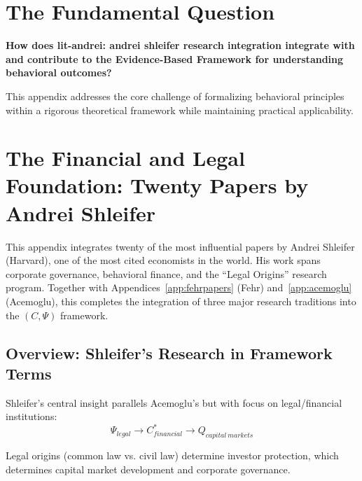 \section{The Fundamental Question}
\label{sec:shl-fundamental}

\begin{tcolorbox}[
    colback=red!5!white,
    colframe=red!75!black,
    title={\textbf{Fundamental Question}}
]
\textbf{How does lit-andrei: andrei shleifer research integration integrate with and contribute to the
Evidence-Based Framework for understanding behavioral outcomes?}

This appendix addresses the core challenge of formalizing behavioral principles
within a rigorous theoretical framework while maintaining practical applicability.
\end{tcolorbox}




\section{The Financial and Legal Foundation: Twenty Papers by Andrei Shleifer}
\label{app:shleifer}

This appendix integrates twenty of the most influential papers by Andrei Shleifer
(Harvard), one of the most cited economists in the world. His work spans
corporate governance, behavioral finance, and the ``Legal Origins'' research
program. Together with Appendices~\ref{app:fehrpapers} (Fehr) and~\ref{app:acemoglu}
(Acemoglu), this completes the integration of three major research traditions
into the $(C, \Psi)$ framework.

\subsection{Overview: Shleifer's Research in Framework Terms}

Shleifer's central insight parallels Acemoglu's but with focus on legal/financial
institutions:
\begin{equation}
  \Psi_{legal} \to C^*_{financial} \to Q_{capital\ markets}
\end{equation}

Legal origins (common law vs. civil law) determine investor protection,
which determines capital market development and corporate governance.

